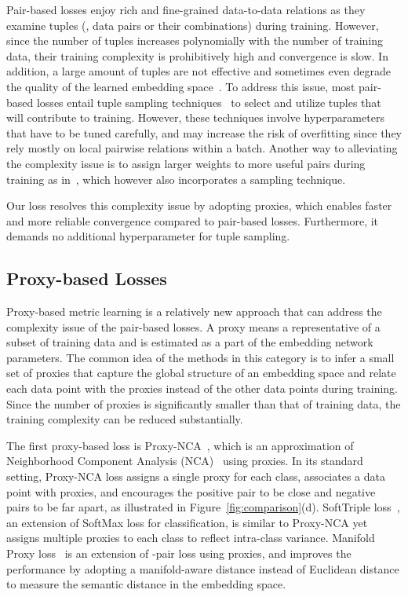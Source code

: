 \documentclass[10pt,twocolumn,letterpaper]{article}
\begin{document}
Pair-based losses enjoy rich and fine-grained data-to-data relations as they examine tuples (\ie, data pairs or their combinations) during training.
However, since the number of tuples increases polynomially with the number of training data, 
their training complexity is prohibitively high and convergence is slow.
In addition, a large amount of tuples are not effective and sometimes even degrade the quality of the learned embedding space~\cite{Schroff2015,sampling_matters}. 
To address this issue, most pair-based losses entail tuple sampling techniques~\cite{Schroff2015,sampling_matters,Harwood_2017_ICCV,Yuan_2017_ICCV} to select and utilize tuples that will contribute to training.
However, these techniques involve hyperparameters that have to be tuned carefully, and may increase the risk of overfitting since they rely mostly on local pairwise relations within a batch. 
Another way to alleviating the complexity issue is to assign larger weights to more useful pairs during training as in~\cite{wang2019multi}, which however also incorporates a sampling technique.

Our loss resolves this complexity issue by adopting proxies, which enables faster and more reliable convergence compared to pair-based losses.
Furthermore, it demands no additional hyperparameter for tuple sampling.



\subsection{Proxy-based Losses}
\label{sec:proxy_loss}
Proxy-based metric learning is a relatively new approach that can address the complexity issue of the pair-based losses.
A proxy means a representative of a subset of training data and is estimated as a part of the embedding network parameters. 
The common idea of the methods in this category is to infer a small set of proxies that capture the global structure of an embedding space and relate each data point with the proxies instead of the other data points during training.
Since the number of proxies is significantly smaller than that of training data, the training complexity can be reduced substantially.


The first proxy-based loss is Proxy-NCA~\cite{movshovitz2017no}, which is an approximation of Neighborhood Component Analysis (NCA)~\cite{goldberger2005} using proxies.
In its standard setting, Proxy-NCA loss assigns a single proxy for each class, associates a data point with proxies, and encourages the positive pair to be close and negative pairs to be far apart, as illustrated in Figure~\ref{fig:comparison}(d).
SoftTriple loss~\cite{Qian_2019_ICCV}, an extension of SoftMax loss for classification, is similar to Proxy-NCA yet assigns multiple proxies to each class to reflect intra-class variance. 
Manifold Proxy loss~\cite{aziere2019ensemble} is an extension of -pair loss using proxies, and improves the performance by adopting a manifold-aware distance instead of Euclidean distance to measure the semantic distance in the embedding space.
\end{document}
